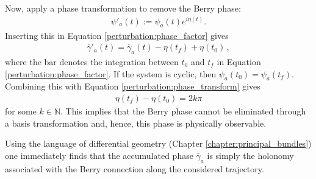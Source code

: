     Now, apply a phase transformation to remove the Berry phase:
    \begin{gather}
        \label{perturbation:phase_transform}
        \psi'_a(t) := \psi_a(t)e^{i\eta(t)}.
    \end{gather}
    Inserting this in Equation \eqref{perturbation:phase_factor} gives
    \begin{gather}
        \bar\gamma'_a(t) = \bar\gamma_a(t) - \eta(t_f) + \eta(t_0)\,,
    \end{gather}
    where the bar denotes the integration between $t_0$ and $t_f$ in Equation \eqref{perturbation:phase_factor}. If the system is cyclic, then $\psi_a(t_0) = \psi_a(t_f)$. Combining this with Equation \eqref{perturbation:phase_transform} gives
    \begin{gather}
        \eta(t_f) - \eta(t_0) = 2k\pi
    \end{gather}
    for some $k\in\mathbb{N}$. This implies that the Berry phase cannot be eliminated through a basis transformation and, hence, this phase is physically observable.

    \begin{remark}[$\clubsuit$]
        Using the language of differential geometry (Chapter \ref{chapter:principal_bundles}) one immediately finds that the accumulated phase $\bar\gamma_a$ is simply the holonomy associated with the Berry connection along the considered trajectory.
    \end{remark}